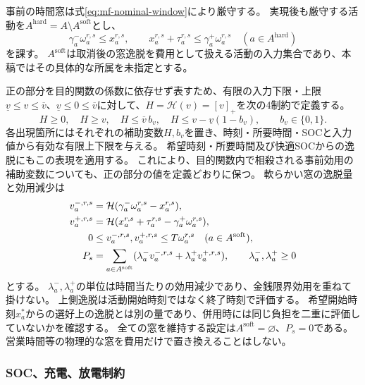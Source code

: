 事前の時間窓は式\eqref{eq:mf-nominal-window}により厳守する。
実現後も厳守する活動を$A^{\mathrm{hard}}=A\setminus A^{\mathrm{soft}}$とし、
\begin{equation}
 \gamma_a^-\omega_a^{r,s}\le x_a^{r,s},\qquad
 x_a^{r,s}+\tau_a^{r,s}\le\gamma_a^+\omega_a^{r,s}
 \quad(a\in A^{\mathrm{hard}})
 \label{eq:mf-realized-hard-window}
\end{equation}
を課す。
$A^{\mathrm{soft}}$は取消後の窓逸脱を費用として扱える活動の入力集合であり、本稿ではその具体的な所属を未指定とする。

正の部分を目的関数の係数に依存せず表すため、有限の入力下限・上限$\underline v\le v\le\overline v$、$\underline v\le0\le\overline v$に対して、$H=\mathcal H(v)=[v]_+$を次の4制約で定義する。
\begin{equation}
 H\ge0,\quad H\ge v,\quad
 H\le\overline v\,b_v,\quad
 H\le v-\underline v(1-b_v),\qquad b_v\in\{0,1\}.
 \label{eq:mf-positive-part}
\end{equation}
各出現箇所にはそれぞれの補助変数$H,b_v$を置き、時刻・所要時間・SOCと入力値から有効な有限上下限を与える。
希望時刻・所要時間及び快適SOCからの逸脱にもこの表現を適用する。
これにより、目的関数内で相殺される事前効用の補助変数についても、正の部分の値を定義どおりに保つ。
軟らかい窓の逸脱量と効用減少は
\begin{align}
 v_a^{-,r,s}&=\mathcal H(\gamma_a^-\omega_a^{r,s}-x_a^{r,s}),\notag\\
 v_a^{+,r,s}&=\mathcal H(x_a^{r,s}+\tau_a^{r,s}-\gamma_a^+\omega_a^{r,s}),\notag\\
 0&\le v_a^{-,r,s},v_a^{+,r,s}\le T\omega_a^{r,s}
 \quad(a\in A^{\mathrm{soft}}),\notag\\
 P_s&=\sum_{a\in A^{\mathrm{soft}}}
   (\lambda_a^-v_a^{-,r,s}+\lambda_a^+v_a^{+,r,s}),
 \qquad\lambda_a^-,\lambda_a^+\ge0
 \label{eq:mf-window-penalty}
\end{align}
とする。
$\lambda_a^-,\lambda_a^+$の単位は時間当たりの効用減少であり、金銭限界効用を重ねて掛けない。
上側逸脱は活動開始時刻ではなく終了時刻で評価する。
希望開始時刻$x_a^*$からの選好上の逸脱とは別の量であり、併用時には同じ負担を二重に評価していないかを確認する。
全ての窓を維持する設定は$A^{\mathrm{soft}}=\varnothing$、$P_s=0$である。
営業時間等の物理的な窓を費用だけで置き換えることはしない。

\subsubsection{SOC、充電、放電制約}

